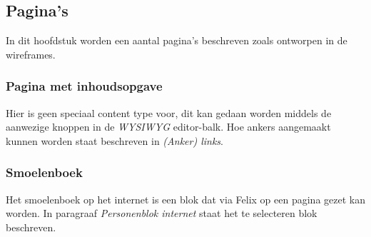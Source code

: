 \subsection{Pagina's}\label{paginas}
In dit hoofdstuk worden een aantal pagina's beschreven zoals ontworpen in de wireframes.

\subsubsection{Pagina met inhoudsopgave}\label{paginainhoudsopgave}
Hier is geen speciaal content type voor, dit kan gedaan worden middels de aanwezige knoppen in de \emph{WYSIWYG} editor-balk. Hoe ankers aangemaakt kunnen worden staat beschreven in \emph{(Anker) links}.

\subsubsection{Smoelenboek}\label{smoelenboek}
Het smoelenboek op het internet is een blok dat via Felix op een pagina gezet kan worden. In paragraaf \emph{Personenblok internet} staat het te selecteren blok beschreven.

